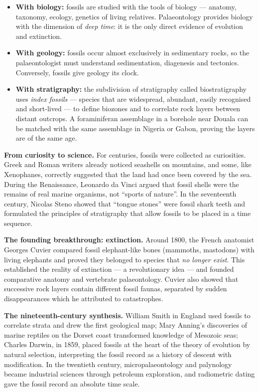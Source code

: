 \documentclass[11pt]{article}
\newcommand{\cle}[1]{{\popxbold\color{popdark}#1}}
\newcounter{popsec}
\newcounter{popsub}
\newcommand{\courssub}[1]{%
  \stepcounter{popsub}%
  \par\vspace{9pt}\noindent{\popxbold\fontsize{11.5}{13}\selectfont\color{popink}{\color{poporange}\thepopsec.\thepopsub}\hspace{6pt}#1}\par\nopagebreak\vspace{4pt}
}
\begin{document}
\begin{itemize}
\item \textbf{With biology:} fossils are studied with the tools of biology --- anatomy, taxonomy, ecology, genetics of living relatives. Palaeontology provides biology with the dimension of \emph{deep time}: it is the only direct evidence of evolution and extinction.
\item \textbf{With geology:} fossils occur almost exclusively in sedimentary rocks, so the palaeontologist must understand sedimentation, diagenesis and tectonics. Conversely, fossils give geology its clock.
\item \textbf{With stratigraphy:} the subdivision of stratigraphy called \cle{biostratigraphy} uses \emph{index fossils} --- species that are widespread, abundant, easily recognised and short-lived --- to define biozones and to correlate rock layers between distant outcrops. A foraminiferan assemblage in a borehole near Douala can be matched with the same assemblage in Nigeria or Gabon, proving the layers are of the same age.
\end{itemize}

\courssub{A Brief History of Palaeontology}

\textbf{From curiosity to science.} For centuries, fossils were collected as curiosities. Greek and Roman writers already noticed seashells on mountains, and some, like Xenophanes, correctly suggested that the land had once been covered by the sea. During the Renaissance, Leonardo da Vinci argued that fossil shells were the remains of real marine organisms, not ``sports of nature''. In the seventeenth century, Nicolas Steno showed that ``tongue stones'' were fossil shark teeth and formulated the principles of stratigraphy that allow fossils to be placed in a time sequence.

\textbf{The founding breakthrough: extinction.} Around 1800, the French anatomist \cle{Georges Cuvier} compared fossil elephant-like bones (mammoths, mastodons) with living elephants and proved they belonged to species that \emph{no longer exist}. This established the reality of \cle{extinction} --- a revolutionary idea --- and founded comparative anatomy and vertebrate palaeontology. Cuvier also showed that successive rock layers contain different fossil faunas, separated by sudden disappearances which he attributed to catastrophes.

\textbf{The nineteenth-century synthesis.} William Smith in England used fossils to correlate strata and drew the first geological map; Mary Anning's discoveries of marine reptiles on the Dorset coast transformed knowledge of Mesozoic seas; Charles Darwin, in 1859, placed fossils at the heart of the theory of evolution by natural selection, interpreting the fossil record as a history of descent with modification. In the twentieth century, micropalaeontology and palynology became industrial sciences through petroleum exploration, and radiometric dating gave the fossil record an absolute time scale.
\end{document}
